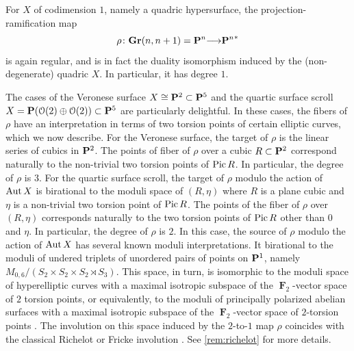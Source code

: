 \documentclass[11pt,reqno]{amsart}
\theoremstyle{plain}
\theoremstyle{definition}
\theoremstyle{remark}
\numberwithin{equation}{section}
\DeclareMathOperator{\F}{\mathbf F}
\renewcommand{\to}{{\longrightarrow}}
\numberwithin{equation}{section}
\renewcommand{\O}{\mathcal O}
\begin{document}
For $X$ of codimension $1$, namely a quadric hypersurface, the projection-ramification map
\[ \rho \from \Gr(n, n+1) = \P^{n} \to {\P^n}^* \]
is again regular, and is in fact the duality isomorphism induced by the (non-degenerate) quadric $X$.
In particular, it has degree $1$.

The cases of the Veronese surface $X \cong \P^2 \subset \P^5$ and the quartic surface scroll $X = \P(\O(2) \oplus \O(2)) \subset \P^5$ are particularly delightful.
In these cases, the fibers of $\rho$ have an interpretation in terms of two torsion points of certain elliptic curves, which we now describe.
For the Veronese surface, the target of $\rho$ is the linear series of cubics in $\P^2$.
The points of fiber of $\rho$ over a cubic $R \subset \P^2$ correspond naturally to the non-trivial two torsion points of $\Pic R$.
In particular, the degree of $\rho$ is $3$.
For the quartic surface scroll, the target of $\rho$ modulo the action of $\Aut X$ is birational to the moduli space of $(R, \eta)$ where $R$ is a plane cubic and $\eta$ is a non-trivial two torsion point of $\Pic R$.
The points of the fiber of $\rho$ over $(R, \eta)$ corresponds naturally to the two torsion points of $\Pic R$ other than $0$ and $\eta$.
In particular, the degree of $\rho$ is $2$.
In this case, the source of $\rho$ modulo the action of $\Aut X$ has several known moduli interpretations.
It birational to the moduli of undered triplets of unordered pairs of points on $\P^1$, namely $M_{0,6}/(S_2 \times S_2 \times S_2 \rtimes S_3)$.
This space, in turn, is isomorphic to the moduli space of hyperelliptic curves with a maximal isotropic subspace of the $\F_2$-vector space of $2$ torsion points, or equivalently, to the moduli of principally polarized abelian surfaces with a maximal isotropic subspace of the $\F_2$-vector space of $2$-torsion points \cite[Example~4.2]{dol.how:15}.
The involution on this space induced by the $2$-to-$1$ map $\rho$ coincides with the classical Richelot or Fricke involution \cite[Remark~4.3]{dol.how:15}.
See \autoref{rem:richelot} for more details.
\end{document}
